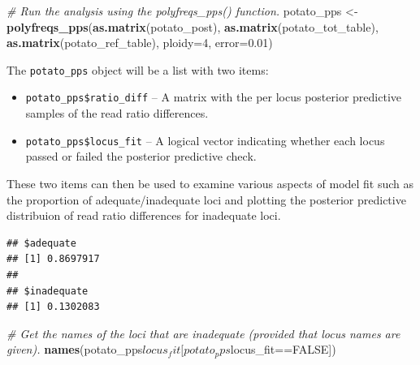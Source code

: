 \documentclass[]{article}
\newenvironment{Shaded}{\begin{snugshade}}{\end{snugshade}}
\newcommand{\KeywordTok}[1]{\textcolor[rgb]{0.13,0.29,0.53}{\textbf{{#1}}}}
\newcommand{\DataTypeTok}[1]{\textcolor[rgb]{0.13,0.29,0.53}{{#1}}}
\newcommand{\DecValTok}[1]{\textcolor[rgb]{0.00,0.00,0.81}{{#1}}}
\newcommand{\FloatTok}[1]{\textcolor[rgb]{0.00,0.00,0.81}{{#1}}}
\newcommand{\StringTok}[1]{\textcolor[rgb]{0.31,0.60,0.02}{{#1}}}
\newcommand{\CommentTok}[1]{\textcolor[rgb]{0.56,0.35,0.01}{\textit{{#1}}}}
\newcommand{\OtherTok}[1]{\textcolor[rgb]{0.56,0.35,0.01}{{#1}}}
\newcommand{\NormalTok}[1]{{#1}}
\begin{document}
\begin{Shaded}
\begin{Highlighting}[]
\CommentTok{# Run the analysis using the polyfreqs_pps() function.}
\NormalTok{potato_pps <-}\StringTok{ }\KeywordTok{polyfreqs_pps}\NormalTok{(}\KeywordTok{as.matrix}\NormalTok{(potato_post), }
                            \KeywordTok{as.matrix}\NormalTok{(potato_tot_table), }
                            \KeywordTok{as.matrix}\NormalTok{(potato_ref_table), }
                            \DataTypeTok{ploidy=}\DecValTok{4}\NormalTok{, }\DataTypeTok{error=}\FloatTok{0.01}\NormalTok{)}
\end{Highlighting}
\end{Shaded}

The \texttt{potato\_pps} object will be a list with two items:

\begin{itemize}
\item
  \texttt{potato\_pps\$ratio\_diff} -- A matrix with the per locus
  posterior predictive samples of the read ratio differences.
\item
  \texttt{potato\_pps\$locus\_fit} -- A logical vector indicating
  whether each locus passed or failed the posterior predictive check.
\end{itemize}

These two items can then be used to examine various aspects of model fit
such as the proportion of adequate/inadequate loci and plotting the
posterior predictive distribuion of read ratio differences for
inadequate loci.

\begin{Shaded}
\end{Shaded}

\begin{verbatim}
## $adequate
## [1] 0.8697917
## 
## $inadequate
## [1] 0.1302083
\end{verbatim}

\begin{Shaded}
\begin{Highlighting}[]
\CommentTok{# Get the names of the loci that are inadequate (provided that locus names are given).}
\KeywordTok{names}\NormalTok{(potato_pps$locus_fit[potato_pps$locus_fit==}\OtherTok{FALSE}\NormalTok{])}
\end{Highlighting}
\end{Shaded}
\end{document}
